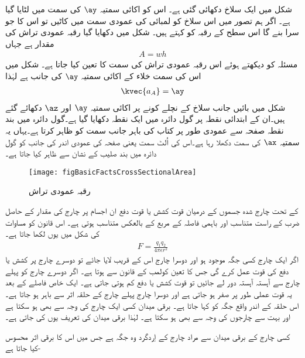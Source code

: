 شکل   میں ایک سلاخ دکھائی گئی ہے۔ اس کو اکائی سمتیہ $\ay$ کی سمت میں لٹایا گیا ہے۔ اگر ہم تصور میں اس سلاخ کو لمبائی کی عمودی سمت میں کاٹیں تو اس کا جو سرا بنے گا اس سطح کے رقبہ کو  کہتے ہیں۔ شکل میں دکھایا گیا رقبہ عمودی تراش  کی مقدار  ہے جہاں
\begin{align}
A=wh
\end{align}
مسئلہ کو دیکھتے ہوئے اس رقبہ عمودی تراش کی سمت کا تعین کیا جاتا ہے۔ شکل میں اس کی سمت   خلاء کے اکائی سمتیہ  $\ay$ کی جانب ہے لہٰذا
\begin{align}
\kvec{a_A}=\ay
\end{align}
شکل میں بائیں جانب سلاخ کے نچلے کونے پر اکائی سمتیہ  $\ay$  اور  $\az$ دکھائے گئے ہیں۔ان کے ابتدائی نقطہ پر گول دائرہ میں ایک نقطہ دکھایا گیا ہے۔گول دائرہ میں بند نقطہ صفحہ سے عمودی طور پر کتاب کی باہر جانب سمت کو ظاہر کرتا ہے۔یہاں یہ سمتیہ  $\ax$ کی سمت دکھلا رہا ہے۔اس کی اُلٹ سمت یعنی صفحہ کی عمودی اندر کی جانب کو گول دائرہ میں بند صلیب کے نشان سے ظاہر کیا جاتا ہے۔
%
\begin{figure}
\centering
\texttt{[image: figBasicFactsCrossSectionalArea]}
\caption{رقبہ  عمودی تراش}
\label{شکل_حقائق_رقبہ_عمودی}
\end{figure}
%
 کے تحت چارج شدہ جسموں کے درمیان قوت کشش یا قوت دفع ان اجسام پر چارج کی مقدار کے حاصل ضرب کے راست متناسب اور باہمی فاصلہ کے مربع کے بالعکس متناسب ہوتی ہے۔ اس قانون کو مساوات کی شکل میں یوں لکھا جاتا ہے۔
\begin{align}\label{مساوات_بنیادی_کولمب_کا_قانون}
F=\frac{q_1 q_2}{4 \pi \epsilon r^2}
\end{align}
	اگر ایک چارج کسی جگہ موجود ہو اور دوسرا چارج اس کے قریب لایا جائے تو دوسرے چارج پر کشش یا دفع کی قوت عمل کرے گی جس کا تعین کولمب کے قانون سے ہوتا ہے۔ اگر دوسرے چارج کو پہلے چارج سے آہستہ آہستہ دور لے جائیں تو قوت کشش یا دفع کم ہوتی جاتی ہے۔ ایک خاص فاصلے کے بعد یہ قوت عملی طور پر صفر ہو جاتی ہے اور دوسرا چارج پہلے چارج کے حلقہ اثر سے باہر ہو جاتا ہے۔ اس حلقہ کے اندر واقع جگہ کو  کہا جاتا ہے۔ برقی میدان کسی ایک چارج کی وجہ سے بھی ہو سکتا ہے اور بہت سے چارجوں کی وجہ سے بھی ہو سکتا ہے۔ لہٰذا برقی میدان کی تعریف یوں کی جاتی ہے۔

 کسی چارج کے برقی میدان سے مراد چارج کے اِردگرد وہ جگہ ہے جس میں اس کا برقی اثر محسوس کیا جاتا ہے-

